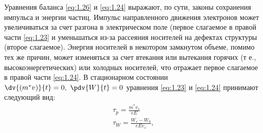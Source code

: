 Уравнения баланса \eqref{eq:1.26} и \eqref{eq:1.24} выражают, по сути, законы сохранения
импульса и энергии частиц. Импульс направленного движения электронов может
увеличиваться за счет разгона в электрическом поле (первое слагаемое в правой
части \eqref{eq:1.23} и уменьшаться из-за рассеяния носителей на дефектах структуры
(второе слагаемое). Энергия носителей в некотором замкнутом объеме, помимо
тех же причин, может изменяться за счет втекания или вытекания горячих (т е.,
высокоэнергетических) или холодных носителей, что отражает первое слагаемое
в правой части \eqref{eq:1.24}.
В стационарном состоянии $\dv{(m^*v)}{t}=0, ~ \pdv{W}{t}=0$ уравнения \eqref{eq:1.23} и
\eqref{eq:1.24} принимают следующий вид:
\begin{gather}
	\label{eq:1.29}
	\tau_p=\frac{m^*v_s}{eE} \\
\label{eq:1.30}
	\tau_W=\frac{W_s-W_0}{eEv_s},
\end{gather}


